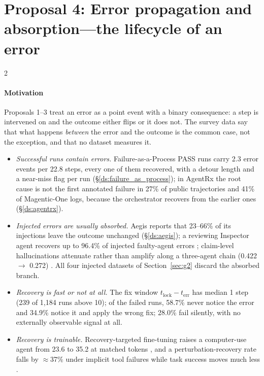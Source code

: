 \section{Proposal 4: Error propagation and absorption---the lifecycle of an error}\label{sec:future:lifecycle}

\begin{multicols}{2}
\paragraph{Motivation} Proposals 1--3 treat an error as a point event with a binary consequence: a step is intervened on and the outcome either flips or it does not. The survey data say that what happens \emph{between} the error and the outcome is the common case, not the exception, and that no dataset measures it.
\begin{itemize}[leftmargin=1.1em]
\item \emph{Successful runs contain errors.} Failure-as-a-Process PASS runs carry 2.3 error events per 22.8 steps, every one of them recovered, with a detour length and a near-miss flag per run (\S\ref{ds:failure_as_process}); in AgentRx the root cause is not the first annotated failure in 27\% of public trajectories and 41\% of Magentic-One logs, because the orchestrator recovers from the earlier ones (\S\ref{ds:agentrx}).
\item \emph{Injected errors are usually absorbed.} Aegis reports that 23--66\% of its injections leave the outcome unchanged (\S\ref{ds:aegis}); a reviewing Inspector agent recovers up to 96.4\% of injected faulty-agent errors \cite{huang2024resilience}; claim-level hallucinations attenuate rather than amplify along a three-agent chain (0.422 $\to$ 0.272) \cite{jamshidi2026cascade}. All four injected datasets of Section~\ref{sec:g2} discard the absorbed branch.
\item \emph{Recovery is fast or not at all.} The fix window $t_{\mathrm{lock}}-t_{\mathrm{err}}$ has median 1 step (239 of 1,184 runs above 10); of the failed runs, 58.7\% never notice the error and 34.9\% notice it and apply the wrong fix; 28.0\% fail silently, with no externally observable signal at all.
\item \emph{Recovery is trainable.} Recovery-targeted fine-tuning raises a computer-use agent from 23.6 to 35.2 at matched tokens \cite{cuarecovery2026}, and a perturbation-recovery rate falls by $\approx$37\% under implicit tool failures while task success moves much less \cite{zhu2026toolmaze}.
\end{itemize}

\end{multicols}
